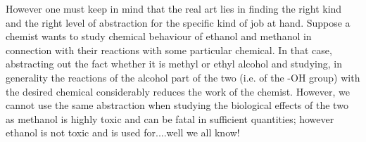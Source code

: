 However one must keep in mind that the real art lies in finding the right kind and the right level of abstraction for the specific kind of job at hand. Suppose a chemist wants to study chemical behaviour of ethanol and methanol in connection with their reactions with some particular chemical. In that case, abstracting out the fact whether it is methyl or ethyl alcohol and studying, in generality the reactions of the alcohol part of the two (i.e. of the -OH group) with the desired chemical considerably reduces the work of the chemist. However, we cannot use the same abstraction when studying the biological effects of the two as methanol is highly toxic and can be fatal in sufficient quantities; however ethanol is not toxic and is used for....well we all know!


